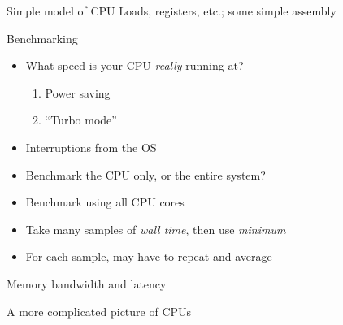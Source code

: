 \documentclass[sans,mathserif]{beamer}
\begin{document}
\begin{frame}{Simple model of CPU}
  Loads, registers, etc.; some simple assembly
\end{frame}



\begin{frame}{Benchmarking}

\begin{itemize}
\item<+-> What speed is your CPU {\em really} running at?
  \begin{enumerate}
  \item Power saving
  \item ``Turbo mode''
  \end{enumerate}

\item<+-> Interruptions from the OS
\item<+-> Benchmark the CPU only, or the entire system?
\end{itemize}

\begin{itemize}
\item<+-> Benchmark using all CPU cores
\item<+-> Take many samples of {\em wall time}, then use {\em minimum}
\item<+-> For each sample, may have to repeat and average
\end{itemize}

\end{frame}

\begin{frame}{Memory bandwidth and latency}
  
\end{frame}

\begin{frame}
  \begin{center}
    \LARGE A more complicated picture of CPUs
  \end{center}
\end{frame}
\end{document}
